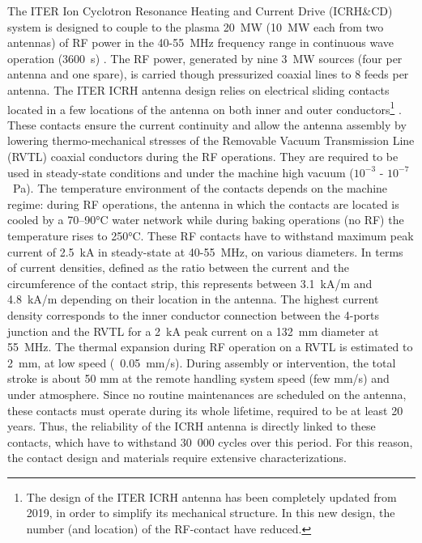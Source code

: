 {The ITER Ion Cyclotron Resonance Heating and Current Drive (ICRH\&CD) system is designed to couple to the plasma 20~MW (10~MW each from two antennas) of RF power in the 40-55~MHz frequency range in continuous wave operation (3600~s) . The RF power, generated by nine 3~MW sources (four per antenna and one spare), is carried though pressurized coaxial lines to 8 feeds per antenna. The ITER ICRH antenna design relies on electrical sliding contacts located in a few locations of the antenna on both inner and outer conductors\footnote{The design of the ITER ICRH antenna has been completely updated from 2019, in order to simplify its mechanical structure. In this new design, the number (and location) of the RF-contact have reduced.} . These contacts ensure the current continuity and allow the antenna assembly by lowering thermo-mechanical stresses of the Removable Vacuum Transmission Line (RVTL) coaxial conductors during the RF operations. They are required to be used in steady-state conditions and under the machine high vacuum ($ 10^{-3}$ - $10^{-7}$~\si{Pa}). The temperature environment of the contacts depends on the machine regime: during RF operations, the antenna in which the contacts are located is cooled by a 70–90$\si{\degreeCelsius}$ water network while during baking operations (no RF) the temperature rises to 250$\si{\degreeCelsius}$. These RF contacts have to withstand maximum peak current of 2.5~kA in steady-state at 40-55~MHz, on various diameters. In terms of current densities, defined as the ratio between the current and the circumference of the contact strip, this represents between 3.1~kA/m and 4.8~kA/m depending on their location in the antenna. The highest current density corresponds to the inner conductor connection between the 4-ports junction and the RVTL for a 2~kA peak current on a 132~mm diameter at 55~MHz. The thermal expansion during RF operation on a RVTL is estimated to 2~mm, at low speed (~0.05~mm/s). During assembly or intervention, the total stroke is about 50 mm at the remote handling system speed (few \si{mm/s}) and under atmosphere. Since no routine maintenances are scheduled on the antenna, these contacts must operate during its whole lifetime, required to be at least 20 years. Thus, the reliability of the ICRH antenna is directly linked to these contacts, which have to withstand 30~000 cycles over this period. For this reason, the contact design and materials require extensive characterizations.


}

